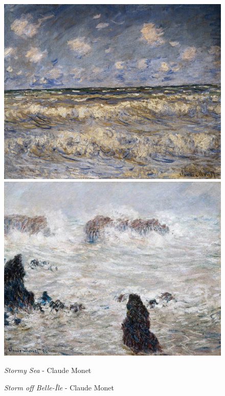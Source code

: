 \documentclass[a4paper]{article}
\begin{document}
\begin {figure}[h!]
\centering
\begin{minipage}[b]{.49\textwidth}
	\centering
	\includegraphics[width=\textwidth]{SeaPaintings/_Ext__Stormy_Sea_-_Monet.jpg}
\end{minipage}
\hfill
\begin{minipage}[b]{.49\textwidth}
	\centering
	\includegraphics[width=\textwidth]{SeaPaintings/_Ext__monetstormoffbelleile.jpg}
\end{minipage}
\begin{minipage}[t]{.49\textwidth}
	\caption{\emph{Stormy Sea} - Claude Monet}
\end{minipage}
\begin{minipage}[t]{.49\textwidth}
	\caption{\emph{Storm off Belle-Île} - Claude Monet}
\end{minipage}
\end{figure}
\end{document}
